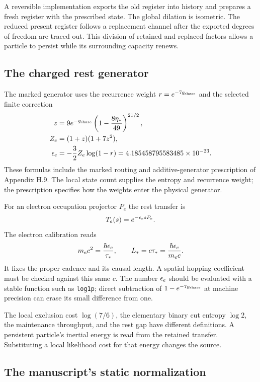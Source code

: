 A reversible implementation exports the old register into history and prepares a fresh register with the prescribed state. The global dilation is isometric. The reduced present register follows a replacement channel after the exported degrees of freedom are traced out. This division of retained and replaced factors allows a particle to persist while its surrounding capacity renews.

\subsection{The charged rest generator}

The marked generator uses the recurrence weight $r=e^{-7g_{\rm share}}$ and the selected finite correction
\begin{align}
z&=9e^{-g_{\rm share}}
\left(1-\frac{8\eta_*}{49}\right)^{21/2},\\
Z_e&=(1+z)(1+7z^2),\\
\epsilon_e&=-\frac32 Z_e\log(1-r)
=4.185458795583485\times10^{-23}.
\label{eq:epsilon}
\end{align}
These formulas include the marked routing and additive-generator prescription of Appendix H.9. The local state count supplies the entropy and recurrence weight; the prescription specifies how the weights enter the physical generator.

For an electron occupation projector $P_e$ the rest transfer is
\begin{equation}
T_e(s)=e^{-\epsilon_e sP_e}.
\end{equation}
The electron calibration reads
\begin{equation}
m_ec^2=\frac{\hbar\epsilon_e}{\tau_*},\qquad
L_*=c\tau_*=\frac{\hbar\epsilon_e}{m_ec}.
\label{eq:electronanchor}
\end{equation}
It fixes the proper cadence and its causal length. A spatial hopping coefficient must be checked against this same $c$. The number $\epsilon_e$ should be evaluated with a stable function such as \texttt{log1p}; direct subtraction of $1-e^{-7g_{\rm share}}$ at machine precision can erase its small difference from one.

The local exclusion cost $\log(7/6)$, the elementary binary cut entropy $\log2$, the maintenance throughput, and the rest gap have different definitions. A persistent particle's inertial energy is read from the retained transfer. Substituting a local likelihood cost for that energy changes the source.

\subsection{The manuscript's static normalization}
\label{sec:mainnormalization}

